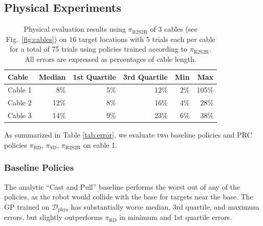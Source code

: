 \documentclass[letterpaper, 10pt, conference]{ieeeconf}  %
\newcommand{\dreal}{\mathcal{D}_\textrm{phys}}
\newcommand{\pitune}{\pi_\textrm{R2S2R}}
\newcommand{\pisim}{\pi_\textrm{SD}}
\newcommand{\pireal}{\pi_\textrm{RD}}
\newcommand{\polarcasting}{Cast and Pull\xspace}
\begin{document}
\subsection{Physical Experiments}
\label{ssec:physical-evaluation}

\begin{table}[t]
  \setlength\tabcolsep{5.0pt}
  \centering
   \small
     \centering
   \begin{tabular}{@{}lrrrrr@{}}
   \toprule
   Cable      & Median & 1st Quartile & 3rd Quartile  & Min & Max   \\
   \midrule
   Cable 1   & 8\% & 5\% & 12\% & 2\% & 105\% \\
   Cable 2   & 12\% & 8\% & 16\%& 4\% & 28\%\\
   Cable 3   & 14\% & 9\% & 23\% & 6\% & 38\% \\
   \toprule
   \end{tabular}
   \caption{
  Physical evaluation results using $\pitune$ of 3 cables (see Fig.~\ref{fig:cables}) on 16 target locations with 5 trials each per cable for a total of 75 trials using policies trained according to $\pitune$. All errors are expressed as percentages of cable length.
   }
   \vspace{-14pt}
  \label{tab:results}
\end{table}

As summarized in Table \ref{tab:error}, we evaluate two baseline policies and PRC policies $\pireal$, $\pisim$, $\pitune$ on cable 1. 
\subsubsection{Baseline Policies} The analytic ``\polarcasting'' baseline performs the worst out of any of the policies, as the robot would collide with the base for targets near the base. The GP trained on $\dreal$ has substantially worse median, 3rd quartile, and maximum errors, but slightly outperforms $\pireal$ in minimum and 1st quartile errors.
\end{document}
